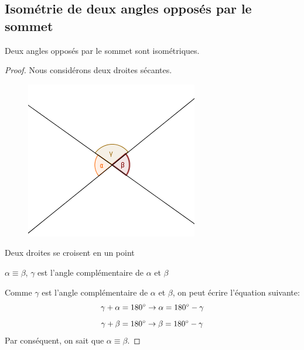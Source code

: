 \documentclass[a4paper,12pt]{article}
\begin{document}
\pagebreak
\subsection{Isométrie de deux angles opposés par le sommet}
\begin{theorem}
Deux angles opposés par le sommet sont isométriques.
\end{theorem}
\begin{proof}
Nous considérons deux droites sécantes.

 \begin{figure}[H]
    \centering
    \includegraphics[scale=0.8]{theorems/oppSommet/anglesym.PNG}
\end{figure}


\begin{hyp}
     Deux droites se croisent en un point
 \end{hyp}
 \begin{concl}
     $\alpha \equiv \beta$, $\gamma$ est l'angle complémentaire de $\alpha$ et $\beta$
 \end{concl}
 Comme $\gamma$ est l'angle complémentaire de $\alpha$ et $\beta$, on peut écrire l'équation suivante:
 \begin{equation}
 \gamma + \alpha = 180\degree \rightarrow \alpha = 180\degree-\gamma
 \end{equation}
 \begin{equation}
 \gamma+ \beta = 180\degree \rightarrow \beta = 180\degree-\gamma
 \end{equation}
 Par conséquent, on sait que $\alpha \equiv \beta$.
\end{proof}
\end{document}
